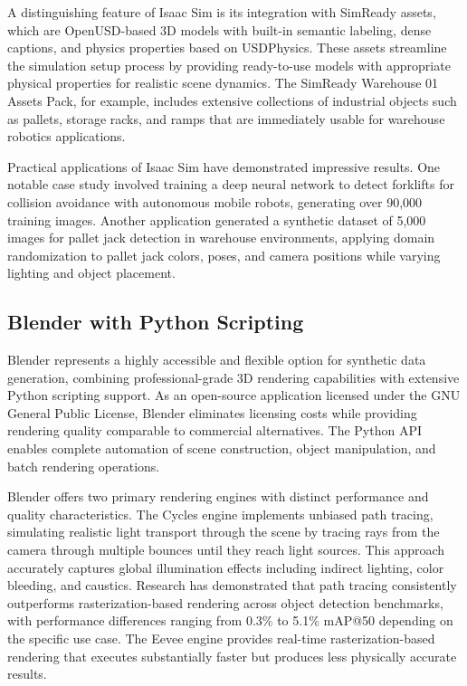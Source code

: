 A distinguishing feature of Isaac Sim is its integration with SimReady assets, which are OpenUSD-based 3D models with built-in semantic labeling, dense captions, and physics properties based on USDPhysics. These assets streamline the simulation setup process by providing ready-to-use models with appropriate physical properties for realistic scene dynamics. The SimReady Warehouse 01 Assets Pack, for example, includes extensive collections of industrial objects such as pallets, storage racks, and ramps that are immediately usable for warehouse robotics applications.

Practical applications of Isaac Sim have demonstrated impressive results. One notable case study involved training a deep neural network to detect forklifts for collision avoidance with autonomous mobile robots, generating over 90,000 training images. Another application generated a synthetic dataset of 5,000 images for pallet jack detection in warehouse environments, applying domain randomization to pallet jack colors, poses, and camera positions while varying lighting and object placement.

\subsection{Blender with Python Scripting}

Blender represents a highly accessible and flexible option for synthetic data generation, combining professional-grade 3D rendering capabilities with extensive Python scripting support. As an open-source application licensed under the GNU General Public License, Blender eliminates licensing costs while providing rendering quality comparable to commercial alternatives. The Python API enables complete automation of scene construction, object manipulation, and batch rendering operations.

Blender offers two primary rendering engines with distinct performance and quality characteristics. The Cycles engine implements unbiased path tracing, simulating realistic light transport through the scene by tracing rays from the camera through multiple bounces until they reach light sources. This approach accurately captures global illumination effects including indirect lighting, color bleeding, and caustics. Research has demonstrated that path tracing consistently outperforms rasterization-based rendering across object detection benchmarks, with performance differences ranging from 0.3\% to 5.1\% mAP@50 depending on the specific use case. The Eevee engine provides real-time rasterization-based rendering that executes substantially faster but produces less physically accurate results.

